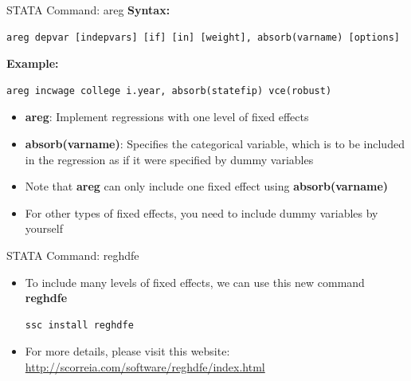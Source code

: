 \documentclass[dvipsnames,hyperref={pdfpagelabels=false}]{beamer}
\begin{document}
\begin{frame}[fragile]{STATA Command: areg}{}
	\noindent\textbf{Syntax:}
\begin{lstlisting}
areg depvar [indepvars] [if] [in] [weight], absorb(varname) [options]
\end{lstlisting}
	
	\noindent\textbf{Example:}
\begin{lstlisting}
areg incwage college i.year, absorb(statefip) vce(robust)
\end{lstlisting}	
\begin{itemize}
	\item \textbf{areg}: Implement regressions with one level of fixed effects
			\vspace{0.2cm}
	\item \textbf{absorb(varname)}: Specifies the categorical variable, which is to be included in the regression as if it were specified by dummy variables
		\vspace{0.2cm}
	\item Note that \textbf{areg} can only include one fixed effect using \textbf{absorb(varname)}
		\vspace{0.2cm}
	\item For other types of fixed effects, you need to include dummy variables by yourself
	
\end{itemize}

	
\end{frame}




\begin{frame}[fragile]{STATA Command: reghdfe}{}
	\begin{itemize}	
	\item To include many levels of fixed effects, we can use this new command \textbf{reghdfe}
\begin{lstlisting}
ssc install reghdfe
\end{lstlisting}

\item For more details, please visit this website: \url{http://scorreia.com/software/reghdfe/index.html}
		
	\end{itemize}
	
	
\end{frame}
\end{document}
